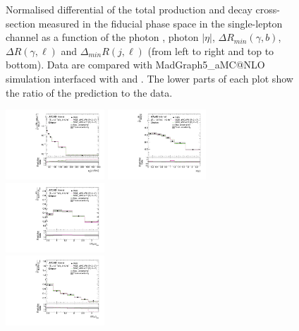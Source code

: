 \begin{figure}[ht]
  \caption{Normalised differential of the total \tty production and decay
  cross-section measured in the fiducial phase space in the single-lepton
  channel as a function of the photon \pt, photon $|\eta|$, $\Delta R_{min}
  (\gamma, b)$, $\Delta R (\gamma, \ell)$ and $\Delta_{min} R (j, \ell)$ (from
  left to right and top to bottom). Data are compared with MadGraph5\_aMC@NLO
  simulation interfaced with \PYTHIA[8] and \HERWIG[7]. The lower parts of each
  plot show the ratio of the prediction to the data. }
  \label{fig:tty_total_diff_Ljets_norm}
\end{figure}
\FloatBarrier

\begin{figure}[ht]
  \centering
  \includegraphics[width=0.33\textwidth]{figures/diff_xsec/normalized-unfolded-distributions/tty_total_dilep/DL_tty_total_pt_unfolded_normalized.pdf}%
  \includegraphics[width=0.33\textwidth]{figures/diff_xsec/normalized-unfolded-distributions/tty_total_dilep/DL_tty_total_eta_unfolded_normalized.pdf}%
  \includegraphics[width=0.33\textwidth]{figures/diff_xsec/normalized-unfolded-distributions/tty_total_dilep/DL_tty_total_drphb_unfolded_normalized.pdf}\\
  \includegraphics[width=0.33\textwidth]{figures/diff_xsec/normalized-unfolded-distributions/tty_total_dilep/DL_tty_total_drphl_unfolded_normalized.pdf}%

\end{figure}
